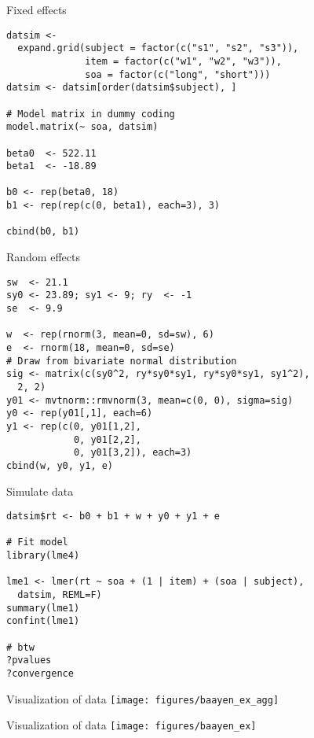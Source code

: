 \documentclass{beamer}
\begin{document}
{

\begin{frame}[fragile]{Fixed effects}
  \begin{lstlisting}
datsim <- 
  expand.grid(subject = factor(c("s1", "s2", "s3")),
              item = factor(c("w1", "w2", "w3")),
              soa = factor(c("long", "short")))
datsim <- datsim[order(datsim$subject), ]

# Model matrix in dummy coding
model.matrix(~ soa, datsim)

beta0  <- 522.11
beta1  <- -18.89

b0 <- rep(beta0, 18)
b1 <- rep(rep(c(0, beta1), each=3), 3)

cbind(b0, b1)
  \end{lstlisting}
\end{frame}

\begin{frame}[fragile]{Random effects}
  \begin{lstlisting}
sw  <- 21.1
sy0 <- 23.89; sy1 <- 9; ry  <- -1
se  <- 9.9

w  <- rep(rnorm(3, mean=0, sd=sw), 6)
e  <- rnorm(18, mean=0, sd=se)
# Draw from bivariate normal distribution
sig <- matrix(c(sy0^2, ry*sy0*sy1, ry*sy0*sy1, sy1^2),
  2, 2)
y01 <- mvtnorm::rmvnorm(3, mean=c(0, 0), sigma=sig)
y0 <- rep(y01[,1], each=6)
y1 <- rep(c(0, y01[1,2],
            0, y01[2,2],
            0, y01[3,2]), each=3)
cbind(w, y0, y1, e)
  \end{lstlisting}
\end{frame}

\begin{frame}[fragile]{Simulate data}
  \begin{lstlisting}
datsim$rt <- b0 + b1 + w + y0 + y1 + e

# Fit model
library(lme4)

lme1 <- lmer(rt ~ soa + (1 | item) + (soa | subject),
  datsim, REML=F)
summary(lme1)
confint(lme1)

# btw
?pvalues
?convergence
  \end{lstlisting}
\end{frame}

}

\begin{frame}{Visualization of data}
  \centering
\texttt{[image: figures/baayen\_ex\_agg]}
\end{frame}

\begin{frame}{Visualization of data}
\texttt{[image: figures/baayen\_ex]}
\end{frame}
\end{document}
